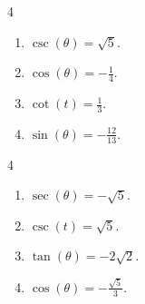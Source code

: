 \documentclass{ximera}
\begin{document}
	\author{Stitz-Zeager}




\begin{multicols}{4}

\begin{enumerate}

\item   $\csc(\theta) = \sqrt{5}$. 

\item  $\cos(\theta) = -\frac{1}{4}$.  

\item   $\cot(t) = \frac{1}{3}$.  

\item $\sin(\theta) = -\frac{12}{13}$.  


\setcounter{HW}{\value{enumi}}

\end{enumerate}

\end{multicols}

\begin{multicols}{4}

\begin{enumerate}
\setcounter{enumi}{\value{HW}}

\item $\sec(\theta) = -\sqrt{5}$.  

\item  $\csc(t) = \sqrt{5}$.  

\item  $\tan(\theta) = -2\sqrt{2}$.  

\item $\cos(\theta) = -\frac{\sqrt{5}}{3}$.

\setcounter{HW}{\value{enumi}}

\end{enumerate}

\end{multicols}
\end{document}
